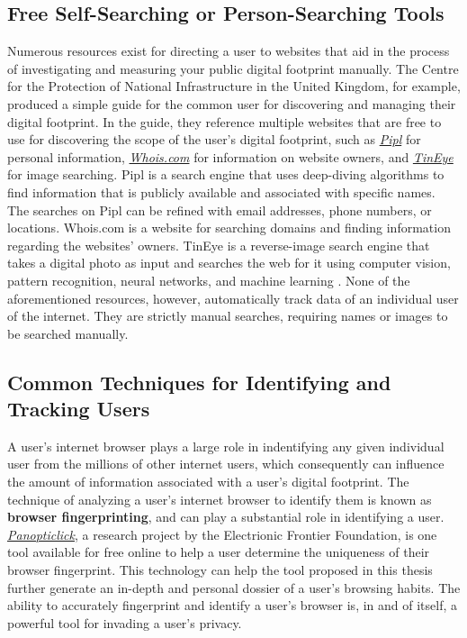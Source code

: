 \documentclass[11pt]{article}
\begin{document}

\subsection{Free Self-Searching or Person-Searching Tools} \label{sec:free}
Numerous resources exist for directing a user to websites that aid in the process of investigating and measuring your public digital footprint manually. The Centre for the Protection of National Infrastructure in the United Kingdom, for example, produced a simple guide for the common user for discovering and managing their digital footprint\cite{cpni-df}. In the guide, they reference multiple websites that are free to use for discovering the scope of the user's digital footprint, such as \href{http://www.pipl.com}{\it Pipl} for personal information, \href{http://www.whois.com}{\it Whois.com} for information on website owners, and \href{http://www.tineye.com}{\it TinEye} for image searching. Pipl is a search engine that uses deep-diving algorithms to find information that is publicly available and associated with specific names. The searches on Pipl can be refined with email addresses, phone numbers, or locations. Whois.com is a website for searching domains and finding information regarding the websites' owners. TinEye is a reverse-image search engine that takes a digital photo as input and searches the web for it using computer vision, pattern recognition, neural networks, and machine learning \cite{tineye}. None of the aforementioned resources, however, automatically track data of an individual user of the internet. They are strictly manual searches, requiring names or images to be searched manually.

\subsection{Common Techniques for Identifying and Tracking Users} \label{sec:common}
A user's internet browser plays a large role in indentifying any given individual user from the millions of other internet users, which consequently can influence the amount of information associated with a user's digital footprint. The technique of analyzing a user's internet browser to identify them is known as {\bf browser fingerprinting}, and can play a substantial role in identifying a user. {\it \href{https://panopticlick.eff.org/}{Panopticlick}}, a research project by the Electrionic Frontier Foundation, is one tool available for free online to help a user determine the uniqueness of their browser fingerprint\cite{panopticlick}. This technology can help the tool proposed in this thesis further generate an in-depth and personal dossier of a user's browsing habits. The ability to accurately fingerprint and identify a user's browser is, in and of itself, a powerful tool for invading a user's privacy.
\end{document}
